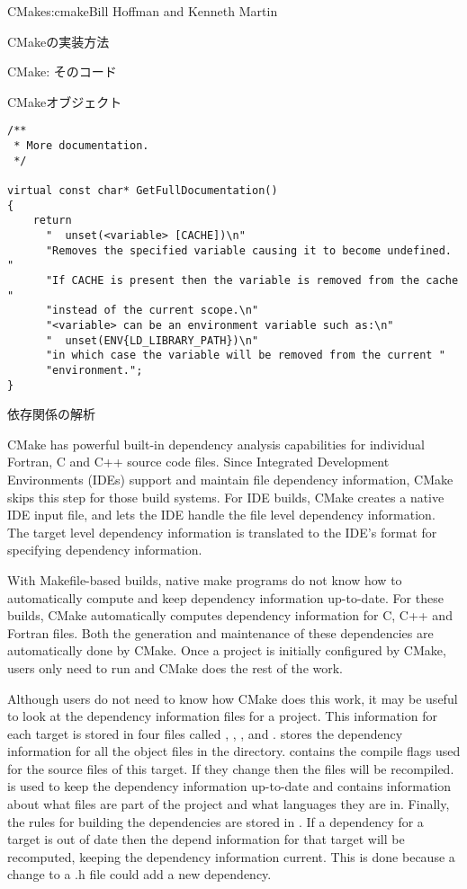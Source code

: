 \begin{aosachapter}{CMake}{s:cmake}{Bill Hoffman and Kenneth Martin}
\begin{aosasect1}{CMakeの実装方法}
\begin{aosasect2}{CMake: そのコード}
\begin{aosasect3}{CMakeオブジェクト}
\begin{verbatim}
/**
 * More documentation.
 */

virtual const char* GetFullDocumentation()
{
    return
      "  unset(<variable> [CACHE])\n"
      "Removes the specified variable causing it to become undefined.  "
      "If CACHE is present then the variable is removed from the cache "
      "instead of the current scope.\n"
      "<variable> can be an environment variable such as:\n"
      "  unset(ENV{LD_LIBRARY_PATH})\n"
      "in which case the variable will be removed from the current "
      "environment.";
}
\end{verbatim}

\end{aosasect3}

\begin{aosasect3}{依存関係の解析}

CMake has powerful built-in dependency analysis capabilities for
individual Fortran, C and C++ source code files. Since Integrated
Development Environments (IDEs) support and maintain file dependency
information, CMake skips this step for those build systems. For IDE
builds, CMake creates a native IDE input file, and lets the IDE handle
the file level dependency information. The target level dependency information
is translated to the IDE's format for specifying dependency information.

With Makefile-based builds, native make programs do not know how to
automatically compute and keep dependency information up-to-date. For
these builds, CMake automatically computes dependency information for
C, C++ and Fortran files. Both the generation and maintenance of these
dependencies are automatically done by CMake. Once a project is
initially configured by CMake, users only need to run  and
CMake does the rest of the work.

Although users do not need to know how CMake does this work, it may be
useful to look at the dependency information files for a project. This
information for each target is stored in four files called
, , , and
.   stores the dependency
information for all the object files in the directory.
 contains the compile flags used for the source files
of this target. If they change then the files will be recompiled.
 is used to keep the dependency information
up-to-date and contains information about what files are part of the
project and what languages they are in. Finally, the rules for
building the dependencies are stored in . If a
dependency for a target is out of date then the depend information
for that target will be recomputed, keeping the dependency information
current. This is done because a change to a .h file could add a new
dependency.


\end{aosasect3}
\end{aosasect2}
\end{aosasect1}
\end{aosachapter}
